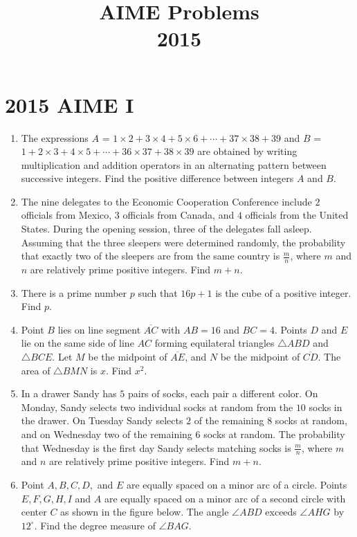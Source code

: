 \documentclass{article}
\title{AIME Problems \\ 2015}
\date{}
\begin{document}
\maketitle\thispagestyle{fancy}\newpage\section*{2015 AIME I}\begin{enumerate}[label=\arabic*., itemsep=0.5em]\item The expressions \(A\) = \( 1 \times 2 + 3 \times 4 + 5 \times 6 + \cdots + 37 \times 38 + 39 \) and \(B\) = \( 1 + 2 \times 3 + 4 \times 5 + \cdots + 36 \times 37 + 38 \times 39 \) are obtained by writing multiplication and addition operators in an alternating pattern between successive integers.  Find the positive difference between integers \(A\) and \(B\).\par \vspace{0.5em}\item The nine delegates to the Economic Cooperation Conference include \(2\) officials from Mexico, \(3\) officials from Canada, and \(4\) officials from the United States. During the opening session, three of the delegates fall asleep. Assuming that the three sleepers were determined randomly, the probability that exactly two of the sleepers are from the same country is \(\frac{m}{n}\), where \(m\) and \(n\) are relatively prime positive integers. Find \(m+n\).\par \vspace{0.5em}\item There is a prime number \(p\) such that \(16p+1\) is the cube of a positive integer.  Find \(p\).\par \vspace{0.5em}\item Point \(B\) lies on line segment \(\overline{AC}\) with \(AB=16\) and \(BC=4\). Points \(D\) and \(E\) lie on the same side of line \(AC\) forming equilateral triangles \(\triangle ABD\) and \(\triangle BCE\). Let \(M\) be the midpoint of \(\overline{AE}\), and \(N\) be the midpoint of \(\overline{CD}\). The area of \(\triangle BMN\) is \(x\). Find \(x^2\).\par \vspace{0.5em}\item In a drawer Sandy has \(5\) pairs of socks, each pair a different color.  On Monday, Sandy selects two individual socks at random from the \(10\) socks in the drawer.  On Tuesday Sandy selects \(2\) of the remaining \(8\) socks at random, and on Wednesday two of the remaining \(6\) socks at random.  The probability that Wednesday is the first day Sandy selects matching socks is \(\frac{m}{n}\), where \(m\) and \(n\) are relatively prime positive integers. Find \(m+n\).\par \vspace{0.5em}\item Point \(A,B,C,D,\) and \(E\) are equally spaced on a minor arc of a circle. Points \(E,F,G,H,I\) and \(A\) are equally spaced on a minor arc of a second circle with center \(C\) as shown in the figure below. The angle \(\angle ABD\) exceeds \(\angle AHG\) by \(12^\circ\). Find the degree measure of \(\angle BAG\).



\end{enumerate}
\end{document}
